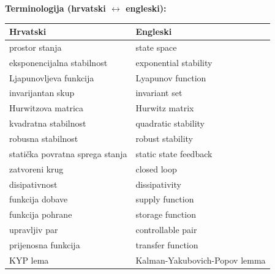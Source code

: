 \textbf{Terminologija (hrvatski $\leftrightarrow$ engleski):}

\begin{center}
\begin{tabular}{ll}
\toprule
\textbf{Hrvatski} & \textbf{Engleski} \\
\midrule
prostor stanja & state space \\
eksponencijalna stabilnost & exponential stability \\
Ljapunovljeva funkcija & Lyapunov function \\
invarijantan skup & invariant set \\
Hurwitzova matrica & Hurwitz matrix \\
kvadratna stabilnost & quadratic stability \\
robusna stabilnost & robust stability \\
statička povratna sprega stanja & static state feedback \\
zatvoreni krug & closed loop \\
disipativnost & dissipativity \\
funkcija dobave & supply function \\
funkcija pohrane & storage function \\
upravljiv par & controllable pair \\
prijenosna funkcija & transfer function \\
KYP lema & Kalman-Yakubovich-Popov lemma \\
\bottomrule
\end{tabular}
\end{center}
